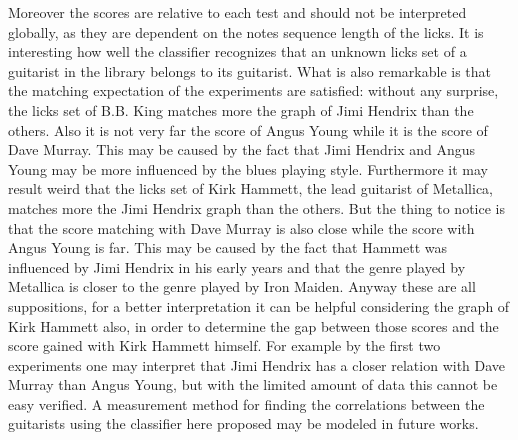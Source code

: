 \documentclass{llncs}
\begin{document}
Moreover the scores are relative to each test and should not be
interpreted globally, as they are dependent on the notes sequence
length of the licks.
It is interesting how well the classifier recognizes that an unknown
licks set of a guitarist in the library belongs to its guitarist. What
is also remarkable is that the matching expectation of the experiments are 
satisfied: without any surprise, the licks set of B.B. King 
matches more the graph of Jimi Hendrix than the others. Also it is not
very far the score of Angus Young while it is the score of Dave Murray.
This may be caused by the fact that Jimi Hendrix and Angus Young may be
more influenced by the blues playing style. Furthermore it may result
weird that the licks set of
Kirk Hammett, the lead guitarist of Metallica, matches more the Jimi
Hendrix graph than the others. But the thing to notice is that the score
matching with Dave Murray is also close while the score with Angus Young
is far. This may be caused by the fact that Hammett was influenced by
Jimi Hendrix \cite{hammet-hendrix} in his early years and that the genre played by Metallica
is closer to the genre played by Iron Maiden. Anyway these are all
suppositions, for a better interpretation it can be helpful considering the
graph of Kirk Hammett also, in order to determine the gap between those
scores and the score gained with Kirk Hammett himself. For example by the
first two experiments one may interpret that Jimi Hendrix has a closer
relation with Dave Murray than Angus Young, but with the limited amount
of data this cannot be easy verified. A measurement method for finding the
correlations between the guitarists using the classifier here proposed
may be modeled in future works.
\end{document}
